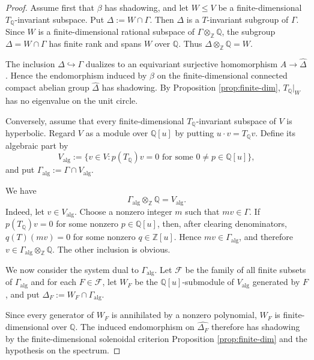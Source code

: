 \documentclass[12pt]{amsart}
\theoremstyle{definition}
\numberwithin{equation}{section}
\theoremstyle{remark}
\begin{document}
\begin{proof}
Assume first that $\beta$ has shadowing, and let $W\leq V$ be a
finite-dimensional $T_{\mathbb Q}$-invariant subspace. Put
$\Delta:=W\cap\Gamma$. Then $\Delta$ is a $T$-invariant subgroup of
$\Gamma$. Since $W$ is a finite-dimensional rational subspace of
$\Gamma\otimes_{\mathbb Z}\mathbb Q$, the subgroup
$\Delta=W\cap\Gamma$ has finite rank and spans $W$ over $\mathbb Q$.
Thus
$
\Delta\otimes_{\mathbb Z}\mathbb Q=W.
$

The inclusion $\Delta\hookrightarrow\Gamma$ dualizes to an equivariant
surjective homomorphism $A\to\widehat\Delta$. Hence the endomorphism
induced by $\beta$ on the finite-dimensional connected compact abelian group
$\widehat\Delta$ has shadowing. By Proposition \ref{prop:finite-dim}, $T_{\mathbb Q}|_W$ has no eigenvalue on the unit circle.

Conversely, assume that every finite-dimensional
$T_{\mathbb Q}$-invariant subspace of $V$ is hyperbolic. Regard $V$ as
a module over $\mathbb Q[u]$ by putting $u\cdot v=T_{\mathbb Q}v$.
Define its algebraic part by
\begin{equation*}
V_{\mathrm{alg}}
:=
\{v\in V:p(T_{\mathbb Q})v=0
\text{ for some }0\neq p\in\mathbb Q[u]\},
\end{equation*}
and put $\Gamma_{\mathrm{alg}}:=\Gamma\cap V_{\mathrm{alg}}$.

We have
\[
\Gamma_{\mathrm{alg}}\otimes_{\mathbb Z}\mathbb Q
=
V_{\mathrm{alg}}.
\]
Indeed, let $v\in V_{\mathrm{alg}}$. Choose a nonzero integer $m$
such that $mv\in\Gamma$. If
$p(T_{\mathbb Q})v=0$ for some nonzero $p\in\mathbb Q[u]$, then,
after clearing denominators,
$q(T)(mv)=0$ for some nonzero $q\in\mathbb Z[u]$. Hence
$mv\in\Gamma_{\mathrm{alg}}$, and therefore
$v\in\Gamma_{\mathrm{alg}}\otimes_{\mathbb Z}\mathbb Q$. The other inclusion is obvious.

We now consider the system dual to $\Gamma_{\mathrm{alg}}$. Let $\mathcal F$ be the family of all finite subsets of $\Gamma_{\mathrm{alg}}$ and for each $F\in \mathcal F$, let $W_F$ be the $\mathbb Q[u]$-submodule of
$V_{\mathrm{alg}}$ generated by $F$, and
put $\Delta_F:=W_F\cap\Gamma_{\mathrm{alg}}$.

Since every generator of $W_F$ is annihilated by a nonzero polynomial,
$W_F$ is finite-dimensional over $\mathbb Q$. The induced
endomorphism on $\widehat{\Delta_F}$ therefore has shadowing by the
finite-dimensional solenoidal criterion Proposition \ref{prop:finite-dim} and the hypothesis on the
spectrum.


\end{proof}
\end{document}
